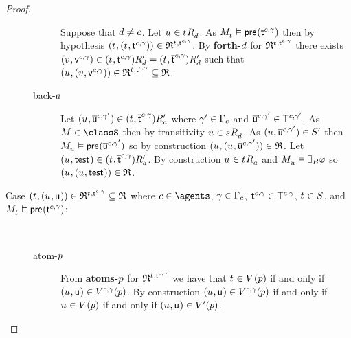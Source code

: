 \begin{proof}
\begin{description}
\begin{description}
                Suppose that $\agentD \neq \agentC$.
                Let $\kStateU \in \kSuccessorsD{\kStateT}$.
                As $\kPModel{\kStateT} \entails \aPrecondition(\aStateT[\agentC, \gamma])$ then by hypothesis $(\kStateT, (\kStateT, \aStateT[\agentC, \gamma])) \in \refinement^{\kStateT, \aStateT[\agentC, \gamma]}$.
                By {\bf forth-$\agentD$} for $\refinement^{\kStateT, \aStateT[\agentC, \gamma]}$ there exists $(\kStateV, \aStateV[\agentC, \gamma]) \in \kSuccessorsPD{(\kStateT, \aStateT[\agentC, \gamma])} = \kSuccessorsPD{(\kStateT, \aPStateT[\agentC, \gamma])}$ such that $(\kStateU, (\kStateV, \aStateV[\agentC, \gamma])) \in \refinement^{\kStateT, \aStateT[\agentC, \gamma]} \subseteq \refinement$.
            \item[back-$\agentA$]
                Let $(\kStateU, \aPStateU[\agentC, \gamma']) \in \kSuccessorsPA{(\kStateT, \aPStateT[\agentC, \gamma])}$ where $\gamma' \in \Gamma_\agentC$ and $\aPStateU[\agentC, \gamma'] \in \aStatesT[\agentC, \gamma']$.
                As $\kModel \in \classS$ then by transitivity $\kStateU \in \kSuccessorsD{\kStateS}$.
                As $(\kStateU, \aPStateU[\agentC, \gamma']) \in \kStatesP$ then $\kPModel{\kStateU} \entails \aPrecondition(\aPStateU[\agentC, \gamma'])$ so by construction $(\kStateU, (\kStateU, \aPStateU[\agentC, \gamma'])) \in \refinement$.
                Let $(\kStateU, \aStateTest) \in \kSuccessorsPA{(\kStateT, \aPStateT[\agentC, \gamma])}$.
                By construction $\kStateU \in \kSuccessorsA{\kStateT}$ and $\kPModel{\kStateU} \entails \somerefsBs \phi$ so $(\kStateU, (\kStateU, \aStateTest)) \in \refinement$.
        \end{description}
    \item[{Case $(\kStateT, (\kStateU, \aStateU)) \in \refinement^{\kStateT, \aStateT[\agentC, \gamma]} \subseteq \refinement$ where $\agentC \in \agents$, $\gamma \in \Gamma_\agentC$, $\aStateT[\agentC, \gamma] \in \aStatesT[\agentC, \gamma]$, $\kStateT \in \kStates$, and $\kPModel{\kStateT} \entails \aPrecondition(\aStateT[\agentC, \gamma])$:}] \hfill\\
        \begin{description}
            \item[atom-$\atomP$]
                From {\bf atoms-$\atomP$} for $\refinement^{\kStateT, \aStateT[\agentC, \gamma]}$ we have that $\kStateT \in \kValuation(\atomP)$ if and only if $(\kStateU, \aStateU) \in \kValuation[\agentC, \gamma](\atomP)$.
                By construction $(\kStateU, \aStateU) \in \kValuation[\agentC, \gamma](\atomP)$ if and only if $\kStateU \in \kValuation(\atomP)$ if and only if $(\kStateU, \aStateU) \in \kValuationP(\atomP)$.

\end{description}
\end{description}
\end{proof}
